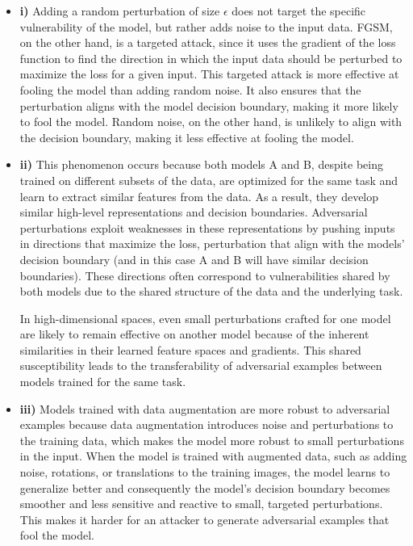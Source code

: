 \documentclass{article}
\begin{document}
\begin{itemize}
    \item \textbf{i)} Adding a random perturbation of size $\epsilon$ does not target the specific vulnerability of the model, but rather adds noise to the input data. FGSM, on the other hand, is a targeted attack, since it uses the gradient of the loss function to find the direction in which the input data should be perturbed to maximize the loss for a given input. This targeted attack is more effective at fooling the model than adding random noise. It also ensures that the perturbation aligns with the model decision boundary, making it more likely to fool the model. Random noise, on the other hand, is unlikely to align with the decision boundary, making it less effective at fooling the model.

    \item \textbf{ii)} This phenomenon occurs because both models A and B, despite being trained on different subsets of the data, are optimized for the same task and learn to extract similar features from the data. As a result, they develop similar high-level representations and decision boundaries. Adversarial perturbations exploit weaknesses in these representations by pushing inputs in directions that maximize the loss, perturbation that align with the models' decision boundary (and in this case A and B will have similar decision boundaries). These directions often correspond to vulnerabilities shared by both models due to the shared structure of the data and the underlying task.

    In high-dimensional spaces, even small perturbations crafted for one model are likely to remain effective on another model because of the inherent similarities in their learned feature spaces and gradients. This shared susceptibility leads to the transferability of adversarial examples between models trained for the same task.

    \item \textbf{iii)} Models trained with data augmentation are more robust to adversarial examples because data augmentation introduces noise and perturbations to the training data, which makes the model more robust to small perturbations in the input. When the model is trained with augmented data, such as adding noise, rotations, or translations to the training images, the model learns to generalize better and consequently the model's decision boundary becomes smoother and less sensitive and reactive to small, targeted perturbations. This makes it harder for an attacker to generate adversarial examples that fool the model.
\end{itemize}
\end{document}
